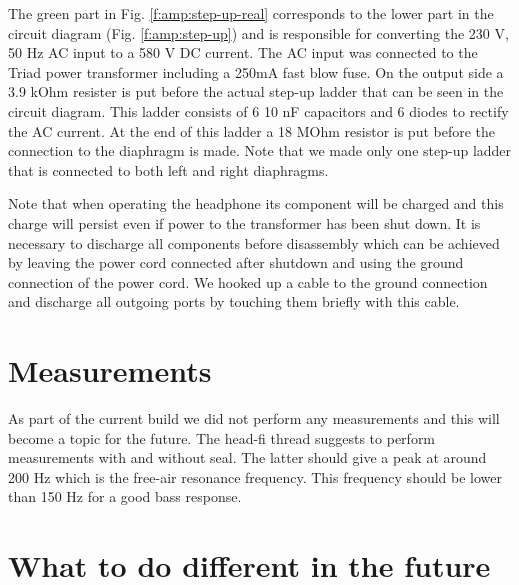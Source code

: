 \documentclass{article}
\begin{document}
The green part in Fig. \ref{f:amp:step-up-real} corresponds to the lower part in the circuit diagram (Fig. \ref{f:amp:step-up}) and is responsible for converting the 230 V, 50 Hz AC input to a 580 V DC current. The AC input was connected to the Triad power transformer including a 250mA fast blow fuse. On the output side a 3.9 kOhm resister is put before the actual step-up ladder that can be seen in the circuit diagram. This ladder consists of 6 10 nF capacitors and 6 diodes to rectify the AC current. At the end of this ladder a 18 MOhm resistor is put before the connection to the diaphragm is made. Note that we made only one step-up ladder that is connected to both left and right diaphragms.

Note that when operating the headphone its component will be charged and this charge will persist even if power to the transformer has been shut down. It is necessary to discharge all components before disassembly which can be achieved by leaving the power cord connected after shutdown and using the ground connection of the power cord. We hooked up a cable to the ground connection and discharge all outgoing ports by touching them briefly with this cable.

%
%
%
%

\section{Measurements}
\label{s:measurements}

As part of the current build we did not perform any measurements and this will become a topic for the future. The head-fi thread suggests to perform measurements with and without seal. The latter should give a peak at around 200 Hz which is the free-air resonance frequency. This frequency should be lower than 150 Hz for a good bass response.

\section{What to do different in the future}
\label{s:future}
\end{document}
